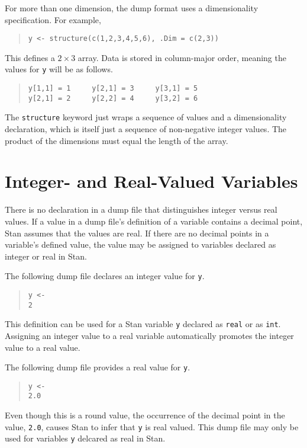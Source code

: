 \documentclass[10pt]{report}
\newcommand{\Stan}{Stan\xspace}
\newcommand{\code}[1]{{\tt #1}}
\begin{document}
For more than one dimension, the dump format uses a dimensionality
specification.  For example,
%
\begin{quote}
\begin{verbatim}
y <- structure(c(1,2,3,4,5,6), .Dim = c(2,3))
\end{verbatim}
\end{quote}
%
This defines a $2 \times 3$ array.  Data is stored in column-major
order, meaning the values for \code{y} will be as follows.
%
\begin{quote}
\begin{Verbatim}
y[1,1] = 1     y[2,1] = 3     y[3,1] = 5    
y[2,1] = 2     y[2,2] = 4     y[3,2] = 6
\end{Verbatim}
\end{quote}
%
The \code{structure} keyword just wraps a sequence of values and a
dimensionality declaration, which is itself just a sequence of
non-negative integer values.  The product of the dimensions must equal
the length of the array.


\section{Integer- and Real-Valued Variables}

There is no declaration in a dump file that distinguishes integer
versus real values.  If a value in a dump file's definition of a
variable contains a decimal point, \Stan assumes that the values are
real.  If there are no decimal points in a variable's defined value, 
the value may be assigned to variables declared as integer or real
in \Stan.

The following dump file declares an integer value for \code{y}.
%
\begin{quote}
\begin{Verbatim} 
y <- 
2
\end{Verbatim}
\end{quote}
% 
This definition can be used for a \Stan variable \code{y} declared as
\code{real} or as \code{int}.  Assigning an integer value to a real
variable automatically promotes the integer value to a real value.

The following dump file provides a real value for \code{y}.
%
\begin{quote}
\begin{Verbatim}
y <-
2.0
\end{Verbatim}
\end{quote}
%
Even though this is a round value, the occurrence of the decimal
point in the value, \code{2.0}, causes \Stan to infer that \code{y} is
real valued.  This dump file may only be used for variables \code{y}
delcared as real in \Stan.
\end{document}
